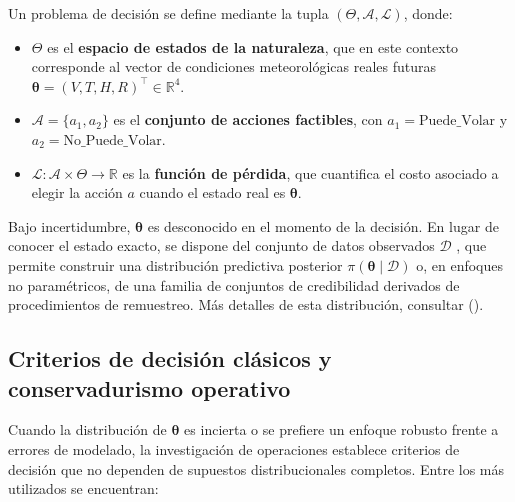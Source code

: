 \documentclass[
  spanish,
  us-letterpaper,
]{scrreprt}
\providecommand{\tightlist}{%
  \setlength{\itemsep}{0pt}\setlength{\parskip}{0pt}}
\numberwithin{equation}{section}
\begin{document}
Un problema de decisión se define mediante la tupla
\((\Theta, \mathcal{A}, \mathcal{L})\), donde:

\begin{itemize}
\tightlist
\item
  \(\Theta\) es el \textbf{espacio de estados de la naturaleza}, que en
  este contexto corresponde al vector de condiciones meteorológicas
  reales futuras
  \(\boldsymbol{\theta} = (V, T, H, R)^\top \in \mathbb{R}^4\).
\item
  \(\mathcal{A} = \{a_1, a_2\}\) es el \textbf{conjunto de acciones
  factibles}, con \(a_1 = \text{Puede\_Volar}\) y
  \(a_2 = \text{No\_Puede\_Volar}\).
\item
  \(\mathcal{L}: \mathcal{A} \times \Theta \to \mathbb{R}\) es la
  \textbf{función de pérdida}, que cuantifica el costo asociado a elegir
  la acción \(a\) cuando el estado real es \(\boldsymbol{\theta}\).
\end{itemize}

Bajo incertidumbre, \(\boldsymbol{\theta}\) es desconocido en el momento
de la decisión. En lugar de conocer el estado exacto, se dispone del
conjunto de datos observados \(\mathcal{D}\) , que permite construir una
distribución predictiva posterior
\(\pi(\boldsymbol{\theta} \mid \mathcal{D})\) o, en enfoques no
paramétricos, de una familia de conjuntos de credibilidad derivados de
procedimientos de remuestreo. Más detalles de esta distribución,
consultar ().

\subsection{Criterios de decisión clásicos y conservadurismo
operativo}\label{criterios-de-decisiuxf3n-cluxe1sicos-y-conservadurismo-operativo}

Cuando la distribución de \(\boldsymbol{\theta}\) es incierta o se
prefiere un enfoque robusto frente a errores de modelado, la
investigación de operaciones establece criterios de decisión que no
dependen de supuestos distribucionales completos. Entre los más
utilizados se encuentran:
\end{document}
